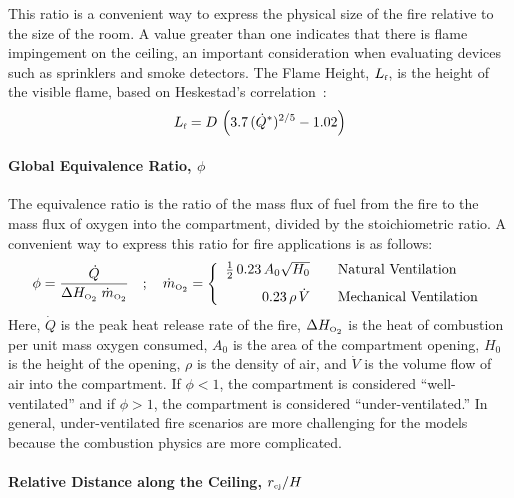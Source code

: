 \documentclass[graybox]{svmult}
\begin{document}
This ratio is a convenient way to express the physical size of the fire relative to the size of the room. A value greater than
one indicates that there is flame impingement on the ceiling, an important consideration when evaluating devices such as sprinklers and smoke detectors.
The Flame Height, $L_{\hbox{\tiny f}}$, is the height of the visible flame, based on Heskestad's correlation~\cite{Heskestad:FSJ1983}:
\begin{equation}
   L_{\hbox{\tiny f}} = D \, \left( 3.7 \, (\dot{Q}^*)^{2/5} - 1.02 \right) \label{Heskestad_Flame_Height}
\end{equation}

\paragraph{Global Equivalence Ratio, $\phi$}

The equivalence ratio is the ratio of the mass flux of fuel from the fire to the mass flux of oxygen into the compartment, divided by the stoichiometric ratio. A convenient way to express this ratio for fire applications is as follows:
\begin{equation}
   \phi = \frac{\dot{Q}}{\Delta H_{\hbox{\tiny O$_2$}} \; \dot{m}_{\hbox{\tiny O$_2$}} } \quad ; \quad  \dot{m}_{\hbox{\tiny O$_2$}} = \left\{
   \begin{array}{r@{\quad \quad}l}
      \frac{1}{2} \, 0.23 \, A_0 \sqrt{H_0} & \hbox{Natural Ventilation} \\ [0.1in]
      0.23 \, \rho \, \dot{V}       & \hbox{Mechanical Ventilation} \end{array} \right.
\end{equation}
Here, $\dot{Q}$ is the peak heat release rate of the fire, $\Delta H_{\hbox{\tiny O$_2$}}$ is the heat of combustion per unit mass oxygen consumed, $A_0$ is the area of the compartment opening, $H_0$ is the height of the opening, $\rho$ is the density of air, and $\dot{V}$ is the
volume flow of air into the compartment. If $\phi<1$, the compartment is considered ``well-ventilated'' and if $\phi>1$, the compartment is considered ``under-ventilated.''
In general, under-ventilated fire scenarios are more challenging for the models because the combustion physics are more complicated.

\paragraph{Relative Distance along the Ceiling, $r_{\hbox{\tiny cj}}/H$}
\end{document}
